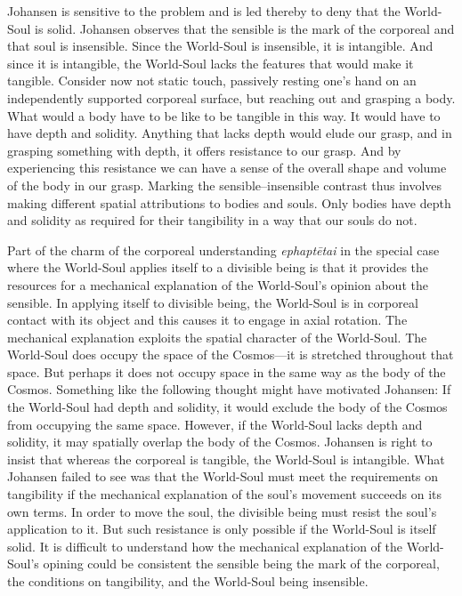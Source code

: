 Johansen is sensitive to the problem and is led thereby to deny that the World-Soul is solid. Johansen observes that the sensible is the mark of the corporeal and that soul is insensible. Since the World-Soul is insensible, it is intangible. And since it is intangible, the World-Soul lacks the features that would make it tangible. Consider now not static touch, passively resting one's hand on an independently supported corporeal surface, but reaching out and grasping a body. What would a body have to be like to be tangible in this way. It would have to have depth and solidity. Anything that lacks depth would elude our grasp, and in grasping something with depth, it offers resistance to our grasp. And by experiencing this resistance we can have a sense of the overall shape and volume of the body in our grasp. Marking the sensible--insensible contrast thus involves making different spatial attributions to bodies and souls. Only bodies have depth and solidity as required for their tangibility in a way that our souls do not.

Part of the charm of the corporeal understanding \emph{ephaptētai} in the special case where the World-Soul applies itself to a divisible being is that it provides the resources for a mechanical explanation of the World-Soul's opinion about the sensible. In applying itself to divisible being, the World-Soul is in corporeal contact with its object and this causes it to engage in axial rotation. The mechanical explanation exploits the spatial character of the World-Soul. The World-Soul does occupy the space of the Cosmos---it is stretched throughout that space. But perhaps it does not occupy space in the same way as the body of the Cosmos. Something like the following thought might have motivated Johansen: If the World-Soul had depth and solidity, it would exclude the body of the Cosmos from occupying the same space. However, if the World-Soul lacks depth and solidity, it may spatially overlap the body of the Cosmos. Johansen is right to insist that whereas the corporeal is tangible, the World-Soul is intangible. What Johansen failed to see was that the World-Soul must meet the requirements on tangibility if the mechanical explanation of the soul's movement succeeds on its own terms. In order to move the soul, the divisible being must resist the soul's application to it. But such resistance is only possible if the World-Soul is itself solid. It is difficult to understand how the mechanical explanation of the World-Soul's opining could be consistent the sensible being the mark of the corporeal, the conditions on tangibility, and the World-Soul being insensible.

